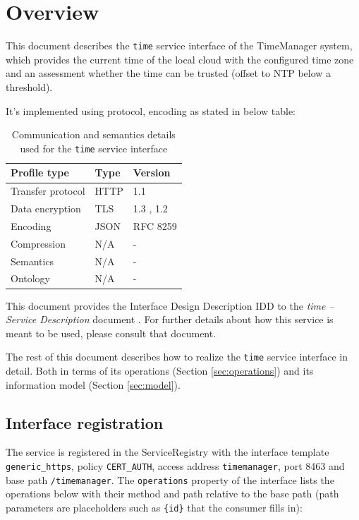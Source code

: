 \documentclass[a4paper]{arrowhead}
\begin{document}
\section{Overview}
\label{sec:overview}

This document describes the \texttt{time} service interface of the TimeManager system, which provides the current time of the local cloud with the configured time zone and an assessment whether the time can be trusted (offset to NTP below a threshold).

It's implemented using protocol, encoding as stated in below table:
\begin{table}[ht!]
  \centering
  \begin{tabular}{|l|l|l|}
    \hline
    \rowcolor{gray!33} Profile type & Type & Version \\ \hline
    Transfer protocol & HTTP & 1.1 \cite{rfc9112} \\ \hline
    Data encryption & TLS & 1.3 \cite{rfc8446}, 1.2 \cite{rfc5246} \\ \hline
    Encoding & JSON & RFC 8259 \cite{rfc8259} \\ \hline
    Compression & N/A & - \\ \hline
    Semantics & N/A & - \\ \hline
    Ontology & N/A & - \\ \hline
  \end{tabular}
  \caption{Communication and semantics details used for the \texttt{time} service interface}
  \label{tab:comunication_semantics_profile}
\end{table}

This document provides the Interface Design Description IDD to the \textit{time -- Service Description} document \cite{tim-time-sd}.
For further details about how this service is meant to be used, please consult that document.

The rest of this document describes how to realize the \texttt{time} service
interface in detail. Both in terms of its operations (Section \ref{sec:operations}) and its information model (Section \ref{sec:model}).

\subsection{Interface registration}

The service is registered in the ServiceRegistry with the interface template \texttt{generic\_\allowbreak{}https}, policy \texttt{CERT\_\allowbreak{}AUTH}, access address \texttt{timemanager}, port 8463 and base path \texttt{/\allowbreak{}timemanager}. The \texttt{operations} property of the interface lists the operations below with their method and path relative to the base path (path parameters are placeholders such as \texttt{\{id\}} that the consumer fills in):
\end{document}
